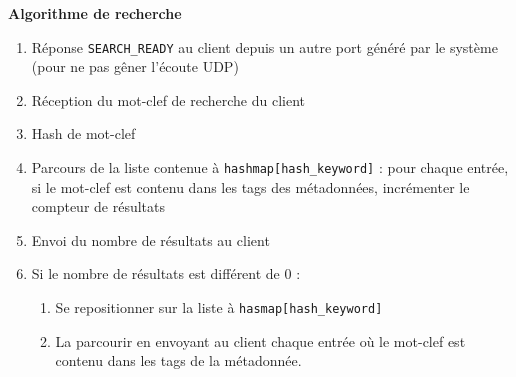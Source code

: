 \noindent \textbf{Algorithme de recherche}

\begin{enumerate}
	\item Réponse \texttt{SEARCH\_READY} au client depuis un autre port généré par le système (pour ne pas gêner l'écoute UDP)
	\item Réception du mot-clef de recherche du client
	\item Hash de mot-clef
	\item Parcours de la liste contenue à \texttt{hashmap[hash\_keyword]} : pour chaque entrée, si le mot-clef est contenu dans les tags des métadonnées, incrémenter le compteur de résultats
	\item Envoi du nombre de résultats au client
	\item Si le nombre de résultats est différent de 0 :
		\begin{enumerate}
			\item Se repositionner sur la liste à \texttt{hasmap[hash\_keyword]}
			\item La parcourir en envoyant au client chaque entrée où le mot-clef est contenu dans les tags de la métadonnée.
		\end{enumerate}
\end{enumerate}